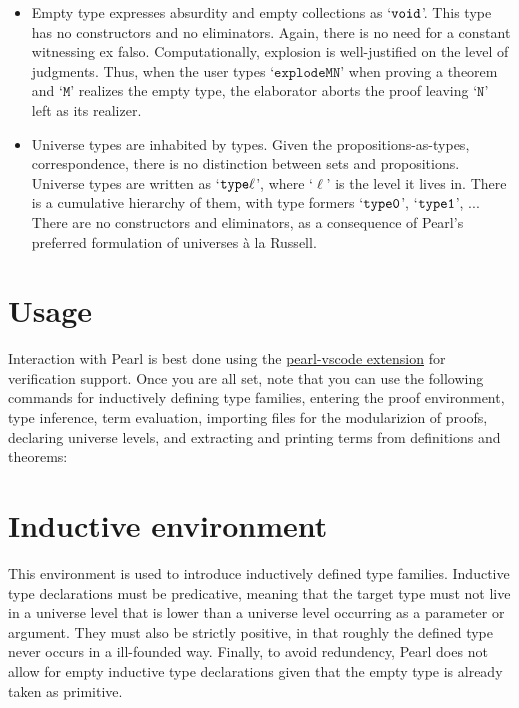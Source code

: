 \documentclass[a4paper]{article}
\begin{document}
\begin{itemize}
	\item Empty type expresses absurdity and empty collections as `$\mathtt{void}$'. This type has no constructors and no eliminators. Again, there is no need for a constant witnessing ex falso. Computationally, explosion is well-justified on the level of judgments. Thus, when the user types `$\mathtt{explode M N}$'  when proving a theorem and `$\mathtt{M}$' realizes the empty type, the elaborator aborts the proof leaving `$\mathtt{N}$' left as its realizer.
	
	\item Universe types are inhabited by types. Given the propositions-as-types, correspondence, there is no distinction between sets and propositions. Universe types are written as `$\mathtt{\mathtt{type} \ell}$', where `$\ell$' is the level it lives in. There is a cumulative hierarchy of them, with type formers `$\mathtt{\mathtt{type} 0}$', `$\mathtt{\mathtt{type} 1}$', ... There are
	no constructors and eliminators, as a consequence of Pearl's preferred
	formulation of universes à la Russell.
\end{itemize}

\section{Usage}

Interaction with Pearl is best done using the \href{https://github.com/bbentzen/pearl/tree/main/vscode}{pearl-vscode extension} for verification support. Once you are all set, note that you can use the following commands for inductively defining type families, entering the proof environment, type inference, term evaluation, importing files for the modularizion of proofs, declaring universe levels, and extracting and printing terms from definitions and theorems:

\section{Inductive environment}

This environment is used to introduce inductively defined type families. Inductive type declarations must be predicative, meaning that the target type must not live in a universe level that is lower than a universe level occurring as a parameter or argument. They must also be strictly positive, in that roughly the defined type never occurs in a ill-founded way. Finally, to avoid redundency, Pearl does not allow for empty inductive type declarations given that the empty type is already taken as primitive.
\end{document}

